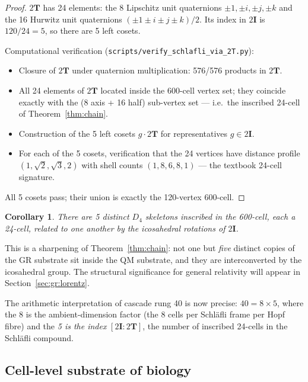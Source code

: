 \documentclass[12pt]{article}
\newtheorem{corollary}[theorem]{Corollary}
\newcommand{\twoT}{2\mathbf{T}}
\newcommand{\twoI}{2\mathbf{I}}
\begin{document}
\begin{proof}
$\twoT$ has 24 elements: the 8 Lipschitz unit quaternions $\pm 1, \pm i, \pm j, \pm k$ and the 16 Hurwitz unit quaternions $(\pm 1 \pm i \pm j \pm k)/2$. Its index in $\twoI$ is $120/24 = 5$, so there are 5 left cosets.

Computational verification (\texttt{scripts/verify\_schlafli\_via\_2T.py}):
\begin{itemize}
    \item Closure of $\twoT$ under quaternion multiplication: 576/576 products in $\twoT$.
    \item All 24 elements of $\twoT$ located inside the 600-cell vertex set; they coincide exactly with the (8 axis + 16 half) sub-vertex set --- i.e.\ the inscribed 24-cell of Theorem~\ref{thm:chain}.
    \item Construction of the 5 left cosets $g \cdot \twoT$ for representatives $g \in \twoI$.
    \item For each of the 5 cosets, verification that the 24 vertices have distance profile $(1, \sqrt{2}, \sqrt{3}, 2)$ with shell counts $(1, 8, 6, 8, 1)$ --- the textbook 24-cell signature.
\end{itemize}
All 5 cosets pass; their union is exactly the 120-vertex 600-cell.
\end{proof}

\begin{corollary}\label{cor:five-skeletons}
There are 5 distinct $D_4$ skeletons inscribed in the 600-cell, each a 24-cell, related to one another by the icosahedral rotations of $\twoI$.
\end{corollary}

This is a sharpening of Theorem~\ref{thm:chain}: not one but \emph{five} distinct copies of the GR substrate sit inside the QM substrate, and they are interconverted by the icosahedral group. The structural significance for general relativity will appear in Section~\ref{sec:gr:lorentz}.

The arithmetic interpretation of cascade rung 40 is now precise: $40 = 8 \times 5$, where the 8 is the ambient-dimension factor (the 8 cells per Schl\"afli frame per Hopf fibre) and the \emph{5 is the index} $[\twoI : \twoT]$, the number of inscribed 24-cells in the Schl\"afli compound.

\subsection{Cell-level substrate of biology}\label{sec:bio:cell}
\end{document}
